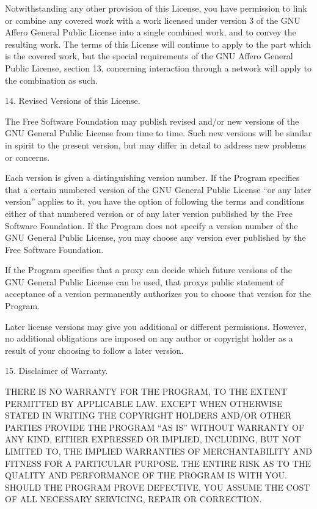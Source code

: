 \documentclass[letterpaper,10pt,english]{sphinxmanual}
\begin{document}
\begin{sphinxVerbatim}[commandchars=\\\{\}]
   Notwithstanding any other provision of this License, you have permission to
   link or combine any covered work with a work licensed under version 3 of the
   GNU Affero General Public License into a single combined work, and to convey
   the resulting work. The terms of this License will continue to apply to the
   part which is the covered work, but the special requirements of the GNU
   Affero General Public License, section 13, concerning interaction through a
   network will apply to the combination as such.

 14. Revised Versions of this License.

   The Free Software Foundation may publish revised and/or new versions of the
   GNU General Public License from time to time. Such new versions will be
   similar in spirit to the present version, but may differ in detail to
   address new problems or concerns.

   Each version is given a distinguishing version number. If the Program
   specifies that a certain numbered version of the GNU General Public License
   “or any later version” applies to it, you have the option of following the
   terms and conditions either of that numbered version or of any later version
   published by the Free Software Foundation. If the Program does not specify a
   version number of the GNU General Public License, you may choose any version
   ever published by the Free Software Foundation.

   If the Program specifies that a proxy can decide which future versions of
   the GNU General Public License can be used, that proxy\PYGZsq{}s public statement of
   acceptance of a version permanently authorizes you to choose that version
   for the Program.

   Later license versions may give you additional or different
   permissions. However, no additional obligations are imposed on any author or
   copyright holder as a result of your choosing to follow a later version.

 15. Disclaimer of Warranty.

   THERE IS NO WARRANTY FOR THE PROGRAM, TO THE EXTENT PERMITTED BY APPLICABLE
   LAW. EXCEPT WHEN OTHERWISE STATED IN WRITING THE COPYRIGHT HOLDERS AND/OR
   OTHER PARTIES PROVIDE THE PROGRAM “AS IS” WITHOUT WARRANTY OF ANY KIND,
   EITHER EXPRESSED OR IMPLIED, INCLUDING, BUT NOT LIMITED TO, THE IMPLIED
   WARRANTIES OF MERCHANTABILITY AND FITNESS FOR A PARTICULAR PURPOSE. THE
   ENTIRE RISK AS TO THE QUALITY AND PERFORMANCE OF THE PROGRAM IS WITH
   YOU. SHOULD THE PROGRAM PROVE DEFECTIVE, YOU ASSUME THE COST OF ALL
   NECESSARY SERVICING, REPAIR OR CORRECTION.


\end{sphinxVerbatim}
\end{document}
